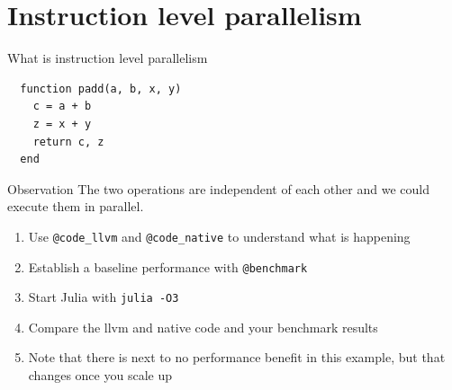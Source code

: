\documentclass{beamer}
\begin{document}
\section{Instruction level parallelism}
\begin{frame}[fragile]{What is instruction level parallelism}

  \begin{lstlisting}
  function padd(a, b, x, y)
    c = a + b
    z = x + y
    return c, z
  end
  \end{lstlisting}

  \begin{block}{Observation}
     The two operations are independent of each other and we could execute them in parallel.
  \end{block}

  \begin{enumerate}
    \item Use \lstinline{@code_llvm} and \lstinline{@code_native} to understand what is happening
    \item Establish a baseline performance with \lstinline{@benchmark}
    \item Start Julia with \lstinline{julia -O3}
    \item Compare the llvm and native code and your benchmark results
    \item Note that there is next to no performance benefit in this example, but that changes once you scale up
  \end{enumerate}
\end{frame}
\end{document}
